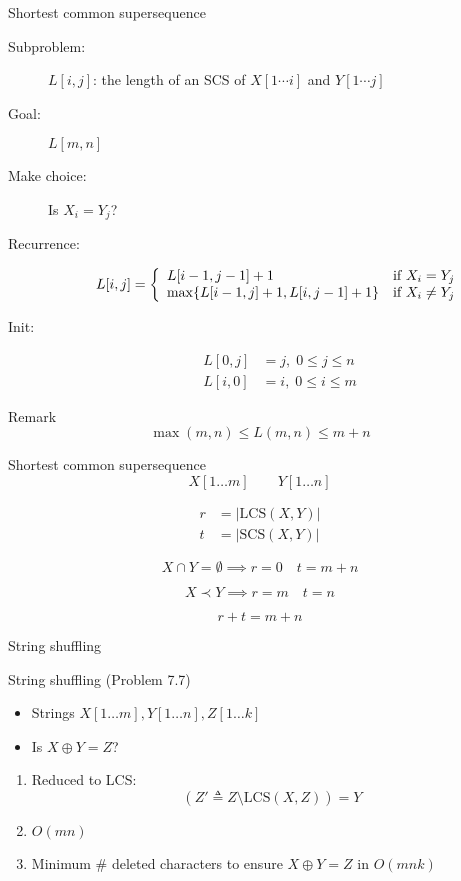 \begin{frame}{Shortest common supersequence}
  \begin{description}
	\item[Subproblem:] $L[i,j]$: the length of an SCS of $X[1 \cdots i]$ and $Y[1 \cdots j]$
	\item[Goal:] $L[m,n]$
	  \pause
	\item[Make choice:] Is $X_{i} = Y_{j}$?
	\item[Recurrence:] 
	  \begin{displaymath}
		L[i,j] = \left\{ \begin{array}{ll}
		  L[i-1, j-1] + 1 & \textrm{if $X_{i} = Y_{j}$}\\
		  \max \{L[i-1,j] + 1, L[i,j-1] + 1\} & \textrm{if $X_{i} \neq Y_{j}$}
		\end{array} \right.
	  \end{displaymath}
	  \pause
	\item[Init:]
	  \begin{align*}
		L[0,j] &= j, \; 0 \le j \le n \\
		L[i,0] &= i, \; 0 \le i \le m 
	  \end{align*}
  \end{description}

  \pause
  \begin{alertblock}{Remark}
	\[
	  \max(m,n) \le L(m,n) \le m+n
	\]
  \end{alertblock}
\end{frame}
\begin{frame}{Shortest common supersequence}
  \[
	X[1 \dots m] \qquad Y[1 \dots n]
  \]

  \begin{align*}
	r &= |\text{LCS}(X,Y)| \\
	t &= |\text{SCS}(X,Y)|  
  \end{align*}

  \pause
  \[
	X \cap Y = \emptyset \implies r = 0 \quad t = m + n
  \]

  \pause
  \[ 
	X \prec Y \implies r = m \quad t = n
  \]

  \pause
  \[
	r + t = m + n
  \]
\end{frame}
\begin{frame}{String shuffling}
  \begin{exampleblock}{String shuffling (Problem 7.7)}
	\begin{itemize}
	  \item Strings $X[1 \dots m], Y[1 \dots n], Z[1 \dots k]$
	  \item Is $X \oplus Y = Z$?
	\end{itemize}

	\begin{enumerate}[(1)]
	  \item Reduced to LCS:
		\[
		  (Z' \triangleq Z \setminus \text{LCS}(X, Z)) = Y
		\]
	  \item $O(mn)$
	  \item Minimum \# deleted characters to ensure $X \oplus Y = Z$ in $O(mnk)$
	\end{enumerate}
  \end{exampleblock}
\end{frame}
